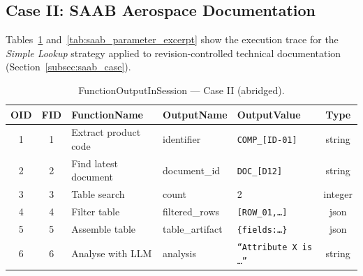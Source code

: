 \subsection{Case II: SAAB Aerospace Documentation}
\label{app:detailed_traces_case2}

Tables~\ref{tab:saab_output_excerpt} and~\ref{tab:saab_parameter_excerpt} show the execution trace for the \emph{Simple Lookup} strategy applied to revision-controlled technical documentation (Section~\ref{subsec:saab_case}).

\begin{table}[H]
\captionsetup{width=0.92\linewidth, skip=1pt}
    \caption{FunctionOutputInSession — Case II (abridged).}
    \label{tab:saab_output_excerpt}
    \centering
    \small
    \setlength{\tabcolsep}{5pt}
    \renewcommand{\arraystretch}{1}
    \begin{tabularx}{\linewidth}{@{}c c p{3.5cm} p{3.0cm} X c@{}}
    \toprule
    \textbf{OID} &
    \textbf{FID} &
    \textbf{FunctionName} &
    \textbf{OutputName} &
    \textbf{OutputValue} &
    \textbf{Type} \\
    \midrule
    1 & 1 & Extract product code & identifier & \texttt{COMP\_[ID-01]} & string \\
    2 & 2 & Find latest document & document\_id & \texttt{DOC\_[D12]} & string \\
    3 & 3 & Table search & count & 2 & integer \\
    4 & 4 & Filter table & filtered\_rows & \texttt{[ROW\_01,\dots]} & json \\
    5 & 5 & Assemble table & table\_artifact & \texttt{\{fields:\dots\}} & json \\
    6 & 6 & Analyse with LLM & analysis & \texttt{``Attribute X is \dots''} & string \\
    \bottomrule
    \end{tabularx}
\end{table}

